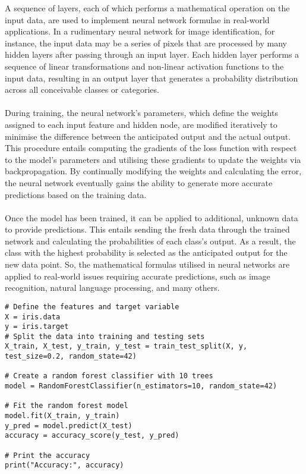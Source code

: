 \documentclass{article}[12pt]
\theoremstyle{definition}
\begin{document}
\noindent
A sequence of layers, each of which performs a mathematical operation on the input data, are used to implement neural network formulae in real-world applications. In a rudimentary neural network for image identification, for instance, the input data may be a series of pixels that are processed by many hidden layers after passing through an input layer. Each hidden layer performs a sequence of linear transformations and non-linear activation functions to the input data, resulting in an output layer that generates a probability distribution across all conceivable classes or categories. 
\\
\\
During training, the neural network's parameters, which define the weights assigned to each input feature and hidden node, are modified iteratively to minimise the difference between the anticipated output and the actual output. This procedure entails computing the gradients of the loss function with respect to the model's parameters and utilising these gradients to update the weights via backpropagation. By continually modifying the weights and calculating the error, the neural network eventually gains the ability to generate more accurate predictions based on the training data. 
\\
\\
Once the model has been trained, it can be applied to additional, unknown data to provide predictions. This entails sending the fresh data through the trained network and calculating the probabilities of each class's output. As a result, the class with the highest probability is selected as the anticipated output for the new data point. So, the mathematical formulas utilised in neural networks are applied to real-world issues requiring accurate predictions, such as image recognition, natural language processing, and many others.

\bigskip

\begin{verbatim}
# Define the features and target variable
X = iris.data
y = iris.target
# Split the data into training and testing sets
X_train, X_test, y_train, y_test = train_test_split(X, y, 
test_size=0.2, random_state=42)

# Create a random forest classifier with 10 trees
model = RandomForestClassifier(n_estimators=10, random_state=42)

# Fit the random forest model
model.fit(X_train, y_train)
y_pred = model.predict(X_test)
accuracy = accuracy_score(y_test, y_pred)

# Print the accuracy
print("Accuracy:", accuracy)
\end{verbatim}
\end{document}

